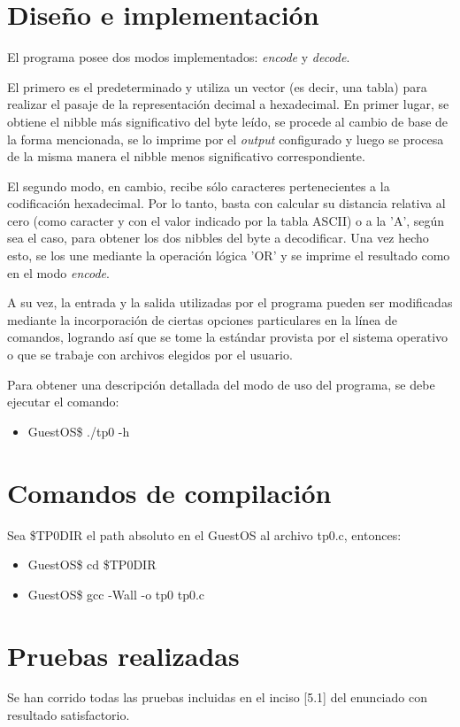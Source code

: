 \documentclass{article}
\begin{document}
\section{Diseño e implementación}
El programa posee dos modos implementados: \textit{encode} y \textit{decode}.\par
El primero es el predeterminado y utiliza un vector (es decir, una tabla) para realizar el pasaje de la representaci\'on decimal a hexadecimal. En primer lugar, se obtiene el nibble más significativo del byte le\'ido, se procede al cambio de base de la forma mencionada, se lo imprime por el \textit{output} configurado y luego se procesa de la misma manera el nibble menos significativo correspondiente.\par
El segundo modo, en cambio, recibe s\'olo caracteres pertenecientes a la codificaci\'on hexadecimal. Por lo tanto, basta con calcular su distancia relativa al cero (como caracter y con el valor indicado por la tabla ASCII) o a la 'A', seg\'un sea el caso, para obtener los dos nibbles del byte a decodificar. Una vez hecho esto, se los une mediante la operaci\'on l\'ogica 'OR' y se imprime el resultado como en el modo \textit{encode}.\par
A su vez, la entrada y la salida utilizadas por el programa pueden ser modificadas mediante la incorporaci\'on de ciertas opciones particulares en la l\'inea de comandos, logrando as\'i que se tome la est\'andar provista por el sistema operativo o que se trabaje con archivos elegidos por el usuario.\par
Para obtener una descripci\'on detallada del modo de uso del programa, se debe ejecutar el comando:
\begin{itemize}
\item GuestOS\$ ./tp0 -h
\end{itemize}

\section{Comandos de compilación}
Sea \$TP0DIR el path absoluto en el GuestOS al archivo tp0.c, entonces:
\begin{itemize}
\item GuestOS\$ cd \$TP0DIR
\item GuestOS\$ gcc -Wall -o tp0 tp0.c
\end{itemize}

\section{Pruebas realizadas}
Se han corrido todas las pruebas incluidas en el inciso [5.1] del enunciado con resultado satisfactorio.
\end{document}
